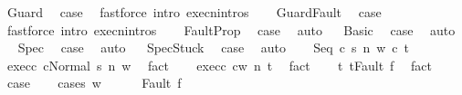 \begin{isabellebody}
\ Guard\ \isamarkupfalse%
\ {\isacharquery}case\ \isamarkupfalse%
\ {\isacharparenleft}fastforce\ intro{\isacharcolon}\ execn{\isachardot}intros{\isacharparenright}\isanewline
{}\isamarkupfalse%
\isanewline
\ \ \isamarkupfalse%
\ GuardFault\ \isamarkupfalse%
\ {\isacharquery}case\ \isamarkupfalse%
\ {\isacharparenleft}fastforce\ intro{\isacharcolon}\ execn{\isachardot}intros{\isacharparenright}\isanewline
{}\isamarkupfalse%
\isanewline
\ \ \isamarkupfalse%
\ FaultProp\ \isamarkupfalse%
\ {\isacharquery}case\ \isamarkupfalse%
\ auto\isanewline
{}\isamarkupfalse%
\isanewline
\ \isamarkupfalse%
\ Basic\ \isamarkupfalse%
\ {\isacharquery}case\ \isamarkupfalse%
\ auto\isanewline
{}\isamarkupfalse%
\isanewline
\ \isamarkupfalse%
\ Spec\ \isamarkupfalse%
\ {\isacharquery}case\ \isamarkupfalse%
\ auto\isanewline
{}\isamarkupfalse%
\isanewline
\ \isamarkupfalse%
\ SpecStuck\ \isamarkupfalse%
\ {\isacharquery}case\ \isamarkupfalse%
\ auto\isanewline
{}\isamarkupfalse%
\isanewline
\ \ \isamarkupfalse%
\ {\isacharparenleft}Seq\ c{}\ s\ n\ w\ c{}\ t{\isacharparenright}\isanewline
\ \ \isamarkupfalse%
\ exec{\isacharunderscore}c{}{\isacharcolon}\ {\isachardoublequoteopen}{\isasymGamma}{\isasymturnstile}{\isasymlangle}c{}{\isacharcomma}Normal\ s{\isasymrangle}\ {\isacharequal}n{\isasymRightarrow}\ w{\isachardoublequoteclose}\ \isamarkupfalse%
\ fact\isanewline
\ \ \isamarkupfalse%
\ exec{\isacharunderscore}c{}{\isacharcolon}\ {\isachardoublequoteopen}{\isasymGamma}{\isasymturnstile}{\isasymlangle}c{}{\isacharcomma}w{\isasymrangle}\ {\isacharequal}n{\isasymRightarrow}\ t{\isachardoublequoteclose}\ \isamarkupfalse%
\ fact\isanewline
\ \ \isamarkupfalse%
\ t{\isacharcolon}\ {\isachardoublequoteopen}t{\isacharequal}Fault\ f{\isachardoublequoteclose}\ \isamarkupfalse%
\ fact\isanewline
\ \ \isamarkupfalse%
\ {\isacharquery}case\isanewline
\ \ \isamarkupfalse%
\ {\isacharparenleft}cases\ w{\isacharparenright}\isanewline
\ \ \ \ \isamarkupfalse%
\ {\isacharparenleft}Fault\ f{\isacharprime}{\isacharparenright}\isanewline

\end{isabellebody}
